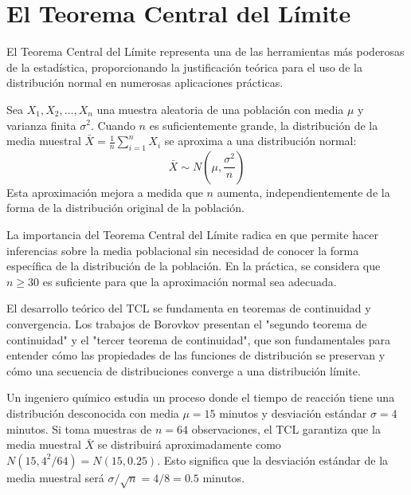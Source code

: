 \section{El Teorema Central del Límite}

El Teorema Central del Límite representa una de las herramientas más poderosas de la estadística, proporcionando la justificación teórica para el uso de la distribución normal en numerosas aplicaciones prácticas.

\begin{theorem}
Sea $X_1, X_2, \ldots, X_n$ una muestra aleatoria de una población con media $\mu$ y varianza finita $\sigma^2$. Cuando $n$ es suficientemente grande, la distribución de la media muestral $\bar{X} = \frac{1}{n}\sum_{i=1}^{n} X_i$ se aproxima a una distribución normal:
\begin{equation}
\bar{X} \sim N\left(\mu, \frac{\sigma^2}{n}\right)
\end{equation}
Esta aproximación mejora a medida que $n$ aumenta, independientemente de la forma de la distribución original de la población.
\end{theorem}

\begin{remark}
La importancia del Teorema Central del Límite radica en que permite hacer inferencias sobre la media poblacional sin necesidad de conocer la forma específica de la distribución de la población. En la práctica, se considera que $n \geq 30$ es suficiente para que la aproximación normal sea adecuada.

El desarrollo teórico del TCL se fundamenta en teoremas de continuidad y convergencia. Los trabajos de Borovkov presentan el "segundo teorema de continuidad" y el "tercer teorema de continuidad", que son fundamentales para entender cómo las propiedades de las funciones de distribución se preservan y cómo una secuencia de distribuciones converge a una distribución límite.
\end{remark}

\begin{example}
Un ingeniero químico estudia un proceso donde el tiempo de reacción tiene una distribución desconocida con media $\mu = 15$ minutos y desviación estándar $\sigma = 4$ minutos. Si toma muestras de $n = 64$ observaciones, el TCL garantiza que la media muestral $\bar{X}$ se distribuirá aproximadamente como $N(15, 4^2/64) = N(15, 0.25)$. Esto significa que la desviación estándar de la media muestral será $\sigma/\sqrt{n} = 4/8 = 0.5$ minutos.
\end{example}

